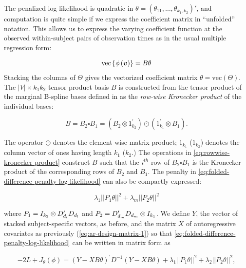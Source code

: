 \vspace{0.5cm}

The penalized log likelihood is quadratic in $\theta = \left(\theta_{11}, \dots, \theta_{k_1, k_2} \right)'$, and computation is quite simple if we express the coefficient matrix in ``unfolded'' notation. This allows us to express the varying coefficient function at the observed within-subject pairs of observation times as in the usual multiple regression form:

\begin{equation*}
\mbox{vec}\left\{\phi\left( \mbox{\boldmath $v$} \right)\right\} = B \theta
\end{equation*}
\noindent
Stacking the columns of $\Theta$ gives the vectorized coefficient matrix $\theta = \mbox{vec}\left( \Theta \right)$. The $\vert V \vert \times k_1 k_2$ tensor product basis $B$ is constructed from the tensor product of the marginal B-spline bases defined in \citet{eilers2006fast} as the \textit{row-wise Kronecker product} of the individual bases:

\begin{equation} \label{eq:rowwise-kronecker-product}
B = B_2 \square B_1 = \left( B_2 \otimes 1^\prime_{k_2} \right) \odot \left(1^\prime_{k_1} \otimes  B_1  \right).
\end{equation}

\noindent
The operator $\odot$ denotes the element-wise matrix product; $1_{k_1}$ ($1_{k_2}$) denotes the column vector of ones having length $k_1$ ($k_2$.) The operations in \ref{eq:rowwise-kronecker-product} construct $B$ such that the $i^{th}$ row of $B_2\square B_1$ is the Kronecker product of the corresponding rows of $B_2$ and $B_1$. The penalty in \ref{eq:folded-difference-penalty-log-likelihood} can also be compactly expressed:

\begin{equation*} \label{eq:tensor-product-penalty}
\lambda_1 \vert \vert P_1 \theta \vert \vert^2 + \lambda_m \vert \vert P_2 \theta \vert\vert^2
\end{equation*}

\noindent
where $P_1 = I_{k_2} \otimes D'_{d_{\scriptscriptstyle l}} D_{d_{\scriptscriptstyle l}} $ and $P_2 =  D'_{d_{\scriptscriptstyle m}} D_{d_{\scriptscriptstyle m}} \otimes I_{k_1}$. We define $Y$, the vector of stacked subject-specific vectors,  as before, and the matrix $X$ of autoregressive covariates as previously (\ref{eq:ar-design-matrix-1}) so that \ref{eq:folded-difference-penalty-log-likelihood} can be written in matrix form as

\begin{equation} \label{eq:tensor-pspline-objective-function}
-2L + J_\theta\left(\phi\right) = \left( Y - XB\theta\right)^\prime D^{-1}\left( Y - XB\theta\right)  + \lambda_1\vert\vert P_1 \theta \vert\vert^2 + \lambda_2 \vert\vert P_2 \theta\vert \vert^2,
\end{equation}

